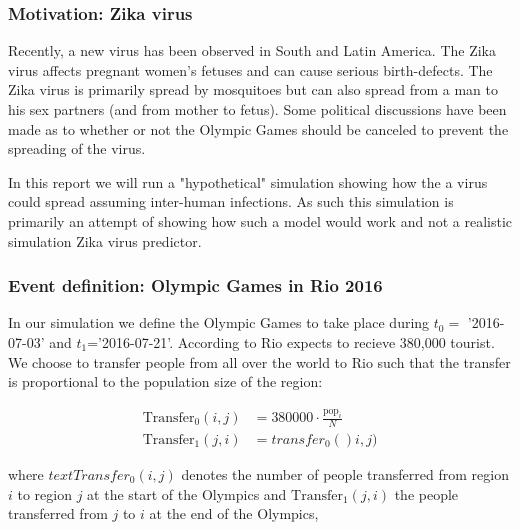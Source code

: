 \subsubsection{Motivation: Zika virus}
Recently, a new virus has been observed in South and Latin America. The Zika virus affects pregnant women's fetuses and can cause serious birth-defects. The Zika virus is primarily spread by mosquitoes but can also spread from a man to his sex partners (and from mother to fetus). Some political discussions have been made as to whether or not the Olympic Games should be canceled to prevent the spreading of the virus.

In this report we will run a "hypothetical" simulation showing how the a virus could spread assuming inter-human infections. As such this simulation is primarily an attempt of showing how such a model would work and not a realistic simulation Zika virus predictor.

\subsubsection{Event definition: Olympic Games in Rio 2016}
In our simulation we define the Olympic Games to take place during $t_0=$ '2016-07-03' and $t_1$='2016-07-21'. According to \cite{theguardian-olympics} Rio expects to recieve 380,000 tourist. We choose to transfer people from all over the world to Rio such that the transfer is proportional to the population size of the region:

\begin{align}
	\text{Transfer}_0(i, j) &= 380000 \cdot \frac{ \text{pop}_i}{N} \\
	\text{Transfer}_1(j, i) &= transfer_0()i, j)
\end{align}

where $text{Transfer}_0(i, j) $ denotes the number of people transferred from region $i$ to region $j$ at the start of the Olympics and $ \text{Transfer}_1(j, i) $ the people transferred from $j$ to $i$ at the end of the Olympics,
